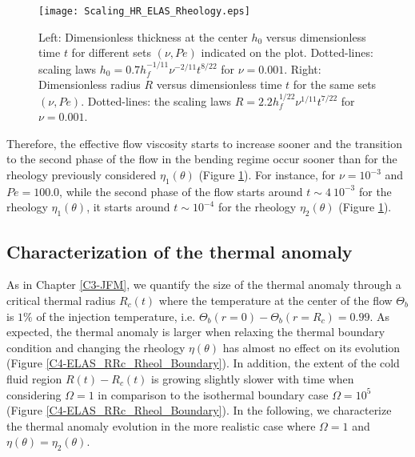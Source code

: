 \begin{figure}[htpb]
  \begin{center}
    \graphicspath{ {/Users/thorey/Documents/These/Projet/Refroidissement/Skin_Model/Figure/Figure_Heating/} }
    \texttt{[image: Scaling\_HR\_ELAS\_Rheology.eps]}
    \caption{Left: Dimensionless thickness at  the center $h_0$ versus
      dimensionless time  $t$ for different sets  $(\nu,Pe)$ indicated
      on      the      plot.      Dotted-lines:      scaling      laws
      $h_0=  0.7h_f^{-1/11}\nu^{-2/11}t^{8/22}$  for  $\nu  =  0.001$.
      Right: Dimensionless  radius $R$  versus dimensionless  time $t$
      for the  same sets  $(\nu,Pe)$.  Dotted-lines: the  scaling laws
      $R= 2.2h_f^{1/22}\nu^{1/11}t^{7/22}$ for $\nu=0.001$.}
    \label{C4-Scaling_HR_ELAS_Rheology}
  \end{center}
\end{figure}

Therefore, the effective flow viscosity  starts to increase sooner and
the transition to  the second phase of the flow  in the bending regime
occur   sooner   than   for   the   rheology   previously   considered
$\eta_1(\theta)$    (Figure   \ref{C4-Scaling_HR_ELAS_Rheology}).     For
instance, for $\nu=10^{-3}$ and $Pe=100.0$,  while the second phase of
the  flow   starts  around  $t\sim   4~  10^{-3}$  for   the  rheology
$\eta_1(\theta)$, it  starts around  $t\sim 10^{-4}$ for  the rheology
$\eta_2(\theta)$ (Figure \ref{C4-Scaling_HR_ELAS_Rheology}).

\subsection{Characterization of the thermal anomaly}
\label{C4-sec:char-therm-anom}

As  in Chapter  \ref{C3-JFM},  we  quantify the  size  of the  thermal
anomaly  through   a  critical  thermal  radius   $R_c(t)$  where  the
temperature  at the  center of  the flow  $\Theta_b$ is  $1\%$ of  the
injection temperature,  i.e.  $\Theta_b(r=0)-\Theta_b(r=R_c)=0.99$. As
expected,  the thermal  anomaly is  larger when  relaxing the  thermal
boundary condition and changing the rheology $\eta(\theta)$ has almost
no        effect        on         its        evolution        (Figure
\ref{C4-ELAS_RRc_Rheol_Boundary}). In addition, the extent of the cold
fluid region $R(t)-R_c(t)$  is growing slightly slower  with time when
considering $\Omega=1$  in comparison to the  isothermal boundary case
$\Omega=10^5$   (Figure  \ref{C4-ELAS_RRc_Rheol_Boundary}).    In  the
following, we characterize  the thermal anomaly evolution  in the more
realistic case where $\Omega=1$ and $\eta(\theta)=\eta_2(\theta)$.

